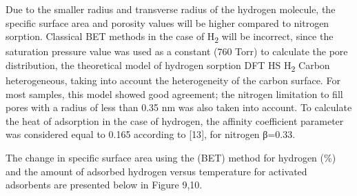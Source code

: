 
Due to the smaller radius and transverse radius of the hydrogen
molecule, the specific surface area and porosity values
\hspace{0pt}\hspace{0pt}will be higher compared to nitrogen sorption.
Classical BET methods in the case of H\textsubscript{2} will be
incorrect, since the saturation pressure value was used as a constant
(760 Torr) to calculate the pore distribution, the theoretical model of
hydrogen sorption DFT HS H\textsubscript{2} Carbon heterogeneous, taking
into account the heterogeneity of the carbon surface. For most samples,
this model showed good agreement; the nitrogen limitation to fill pores
with a radius of less than 0.35 nm was also taken into account. To
calculate the heat of adsorption in the case of hydrogen, the affinity
coefficient parameter was considered equal to 0.165 according to
{[}13{]}, for nitrogen β=0.33.

The change in specific surface area using the (BET) method for hydrogen
(\%) and the amount of adsorbed hydrogen versus temperature for
activated adsorbents are presented below in Figure 9,10.

